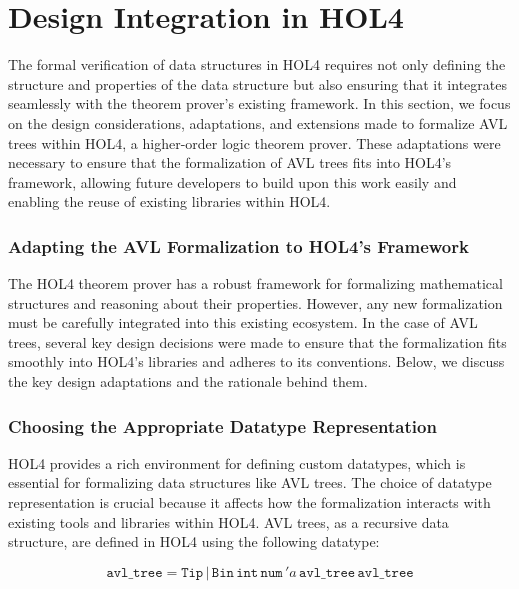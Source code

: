\chapter{Design Integration in HOL4}\label{chap:LaTeXAdvice}

The formal verification of data structures in HOL4 requires not only defining the structure and properties of the data structure but also ensuring that it integrates seamlessly with the theorem prover's existing framework. In this section, we focus on the design considerations, adaptations, and extensions made to formalize AVL trees within HOL4, a higher-order logic theorem prover. These adaptations were necessary to ensure that the formalization of AVL trees fits into HOL4’s framework, allowing future developers to build upon this work easily and enabling the reuse of existing libraries within HOL4.

\subsection{Adapting the AVL Formalization to HOL4’s Framework}

The HOL4 theorem prover has a robust framework for formalizing mathematical structures and reasoning about their properties. However, any new formalization must be carefully integrated into this existing ecosystem. In the case of AVL trees, several key design decisions were made to ensure that the formalization fits smoothly into HOL4’s libraries and adheres to its conventions. Below, we discuss the key design adaptations and the rationale behind them.


\subsection{Choosing the Appropriate Datatype Representation}

HOL4 provides a rich environment for defining custom datatypes, which is essential for formalizing data structures like AVL trees. The choice of datatype representation is crucial because it affects how the formalization interacts with existing tools and libraries within HOL4. AVL trees, as a recursive data structure, are defined in HOL4 using the following datatype:

\[
\texttt{avl\_tree} = \texttt{Tip} \, | \, \texttt{Bin} \, \texttt{int} \, \texttt{num} \, 'a \, \texttt{avl\_tree} \, \texttt{avl\_tree}
\]

